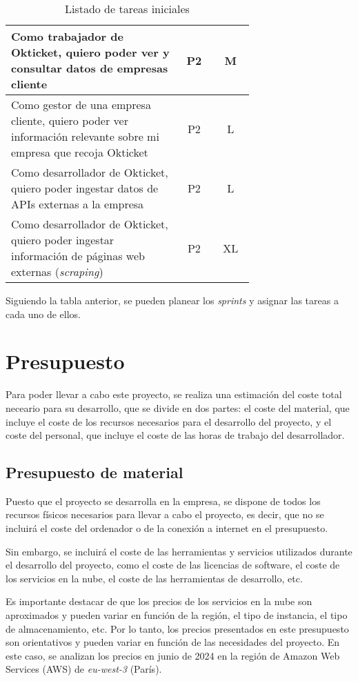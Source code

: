 \begin{table}[H]
\begin{tabular}{|p{0.7\linewidth}|c|c|}
		\hline
		Como trabajador de Okticket, quiero poder ver y consultar datos de empresas cliente & P2\cellcolor{yellow!50} & M\cellcolor{yellow!50} \\
		\hline
		Como gestor de una empresa cliente, quiero poder ver información relevante sobre mi empresa que recoja Okticket & P2\cellcolor{yellow!50} & L\cellcolor{orange!50} \\
		\hline
		Como desarrollador de Okticket, quiero poder ingestar datos de APIs externas a la empresa & P2\cellcolor{yellow!50} & L\cellcolor{orange!50} \\
		\hline
		Como desarrollador de Okticket, quiero poder ingestar información de páginas web externas (\textit{scraping}) & P2\cellcolor{yellow!50} & XL\cellcolor{red!50} \\
		\hline
	\end{tabular}
	\caption{Listado de tareas iniciales}
	\label{tab:initial_tasks}
\end{table}

Siguiendo la tabla anterior, se pueden planear los \textit{sprints} y
asignar las tareas a cada uno de ellos.


\newpage{}
\section{Presupuesto}\label{sec:presupuesto}
Para poder llevar a cabo este proyecto, se realiza una estimación del coste
total neceario para su desarrollo, que se divide en dos partes: el coste del
material, que incluye el coste de los recursos necesarios para el desarrollo del
proyecto, y el coste del personal, que incluye el coste de las horas de trabajo
del desarrollador.


\subsection{Presupuesto de material}\label{subsec:pres_material}
Puesto que el proyecto se desarrolla en la empresa, se dispone de todos los
recursos físicos necesarios para llevar a cabo el proyecto, es decir, que no se
incluirá el coste del ordenador o de la conexión a internet en el presupuesto.

Sin embargo, se incluirá el coste de las herramientas y servicios utilizados
durante el desarrollo del proyecto, como el coste de las licencias de software,
el coste de los servicios en la nube, el coste de las herramientas de
desarrollo, etc.

Es importante destacar de que los precios de los servicios en la nube son
aproximados y pueden variar en función de la región, el tipo de instancia, el
tipo de almacenamiento, etc. Por lo tanto, los precios presentados en este
presupuesto son orientativos y pueden variar en función de las necesidades del
proyecto. En este caso, se analizan los precios en junio de 2024 en la región
de Amazon Web Services (AWS) de \textit{eu-west-3} (París).

